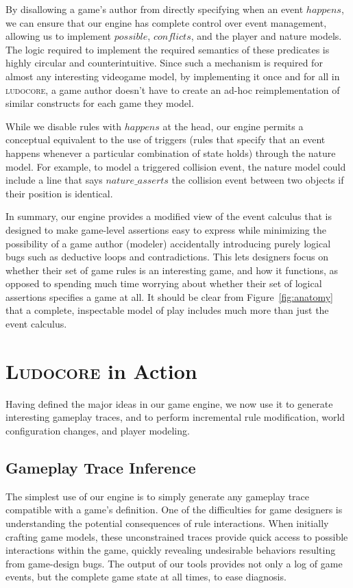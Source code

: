 \documentclass[conference]{IEEEtran}
\newcommand{\ludocore}{\textsc{ludocore}}
\newcommand{\Ludocore}{\textsc{Ludocore}}
\newcommand{\logical}[1]{$#1$}
\begin{document}
By disallowing a game's author from directly specifying when an event
\logical{happens}, we can ensure that our engine has complete control over
event management, allowing us to implement \logical{possible},
\logical{conflicts}, and the player and nature models. The logic required to
implement the required semantics of these predicates is highly circular and
counterintuitive. Since such a mechanism is required for almost any interesting
videogame model, by implementing it once and for all in \ludocore, a game
author doesn't have to create an ad-hoc reimplementation of similar constructs
for each game they model.

While we disable rules with \logical{happens} at the head, our engine permits a
conceptual equivalent to the use of triggers (rules that specify that an event
happens whenever a particular combination of state holds) through the nature
model. For example, to model a triggered collision event, the nature model
could include a line that says \logical{nature\_asserts} the collision event
between two objects if their position is identical.

In summary, our engine provides a modified view of the event calculus that
is designed to make game-level assertions easy to express while minimizing the
possibility of a game author (modeler) accidentally introducing purely logical
bugs such as deductive loops and contradictions.  This lets designers focus on
whether their set of game rules is an interesting game, and how it functions,
as opposed to spending much time worrying about whether their set of logical
assertions specifies a game at all. It should be clear from
Figure~\ref{fig:anatomy} that a complete, inspectable model of play includes
much more than just the event calculus.

\section{\Ludocore{} in Action}

Having defined the major ideas in our game engine, we now use it to
generate interesting gameplay traces, and to perform incremental rule
modification, world configuration changes, and player modeling.

\subsection{Gameplay Trace Inference}

The simplest use of our engine is to simply generate any gameplay trace
compatible with a game's definition. One of the difficulties for game designers
is understanding the potential consequences of rule interactions. When
initially crafting game models, these unconstrained traces provide quick access
to possible interactions within the game, quickly revealing undesirable
behaviors resulting from game-design bugs.  The output of our tools provides
not only a log of game events, but the complete game state at all times, to
ease diagnosis.
\end{document}
